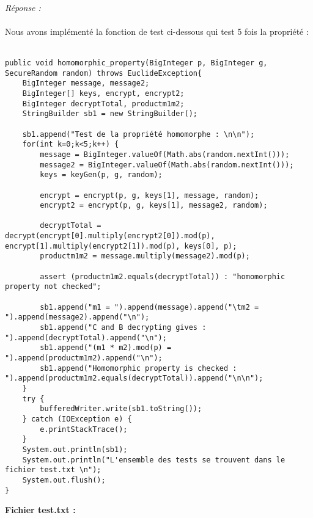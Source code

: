 \documentclass[a4paper,11pt]{article}
\begin{document}
        \textit{\\Réponse :} \\\\Nous avons implémenté la fonction de test ci-dessous qui test 5 fois la propriété : \\\\\begin{lstlisting}
public void homomorphic_property(BigInteger p, BigInteger g, SecureRandom random) throws EuclideException{
    BigInteger message, message2;
    BigInteger[] keys, encrypt, encrypt2;
    BigInteger decryptTotal, productm1m2;
    StringBuilder sb1 = new StringBuilder();

    sb1.append("Test de la propriété homomorphe : \n\n");
    for(int k=0;k<5;k++) {
        message = BigInteger.valueOf(Math.abs(random.nextInt()));
        message2 = BigInteger.valueOf(Math.abs(random.nextInt()));
        keys = keyGen(p, g, random);

        encrypt = encrypt(p, g, keys[1], message, random);
        encrypt2 = encrypt(p, g, keys[1], message2, random);

        decryptTotal = decrypt(encrypt[0].multiply(encrypt2[0]).mod(p), encrypt[1].multiply(encrypt2[1]).mod(p), keys[0], p);
        productm1m2 = message.multiply(message2).mod(p);

        assert (productm1m2.equals(decryptTotal)) : "homomorphic property not checked";

        sb1.append("m1 = ").append(message).append("\tm2 = ").append(message2).append("\n");
        sb1.append("C and B decrypting gives : ").append(decryptTotal).append("\n");
        sb1.append("(m1 * m2).mod(p) = ").append(productm1m2).append("\n");
        sb1.append("Homomorphic property is checked : ").append(productm1m2.equals(decryptTotal)).append("\n\n");
    }
    try {
        bufferedWriter.write(sb1.toString());
    } catch (IOException e) {
        e.printStackTrace();
    }
    System.out.println(sb1);
    System.out.println("L'ensemble des tests se trouvent dans le fichier test.txt \n");
    System.out.flush();
}
\end{lstlisting}
        \textbf{Fichier test.txt : }
\end{document}
